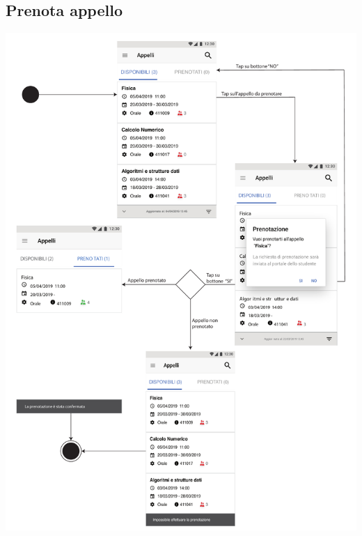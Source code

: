 \subsection{Prenota appello }
\begin{center}
	\includegraphics[width=6in]{imgs/gruppo1/activity_diagrams/AD11_prenota_apppello.pdf}
\end{center}
\newpage


